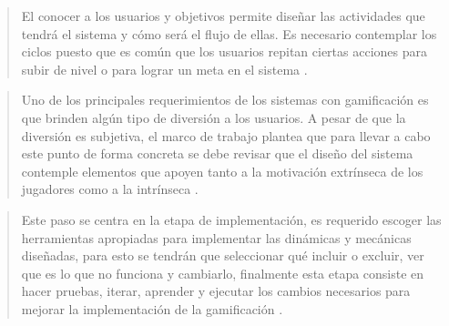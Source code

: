     \begin{quote}
        El conocer a los usuarios y objetivos permite diseñar las actividades que tendrá
        el sistema y cómo será el flujo de ellas. Es necesario contemplar los ciclos puesto
        que es común que los usuarios repitan ciertas acciones para subir de nivel o para
        lograr un meta en el sistema \cite[p. 66]{ForTheWin}.
    \end{quote}



    \begin{quote}
        Uno de los principales requerimientos de los sistemas con gamificación es que brinden
        algún tipo de diversión a los usuarios. A pesar de que la diversión es subjetiva, el
        marco de trabajo plantea que para llevar a cabo este punto de forma concreta se
        debe revisar que el diseño del sistema contemple elementos que apoyen tanto a la
        motivación extrínseca de los jugadores como a la intrínseca \cite[p. 68]{ForTheWin}.
    \end{quote}


    \begin{quote}
        Este paso se centra en la etapa de implementación, es requerido escoger las herramientas
        apropiadas para implementar las dinámicas y mecánicas diseñadas, para esto se tendrán
        que seleccionar qué incluir o excluir, ver que es lo que no funciona y cambiarlo,
        finalmente esta etapa consiste en hacer pruebas, iterar, aprender y ejecutar los cambios
        necesarios para mejorar la implementación de la gamificación \cite[p. 69]{ForTheWin}.
    \end{quote}
